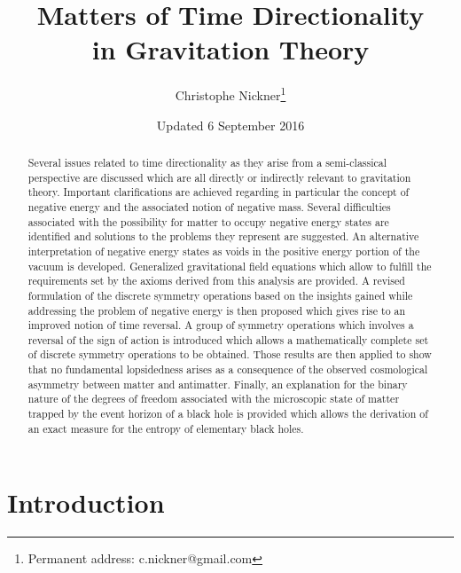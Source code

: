 \documentclass[notitlepage,12pt]{report}
\title{\bf Matters of Time Directionality\\ in Gravitation Theory}
\author{Christophe Nickner\footnote{Permanent address: {\ttfamily c.nickner@gmail.com}}}
\date{\normalsize{Updated 6 September 2016}}
\begin{document}
\maketitle

\begin{abstract}
Several issues related to time directionality as they arise from a semi-classical perspective are discussed which are all directly or indirectly relevant to gravitation theory. Important clarifications are achieved regarding in particular the concept of negative energy and the associated notion of negative mass. Several difficulties associated with the possibility for matter to occupy negative energy states are identified and solutions to the problems they represent are suggested. An alternative interpretation of negative energy states as voids in the positive energy portion of the vacuum is developed. Generalized gravitational field equations which allow to fulfill the requirements set by the axioms derived from this analysis are provided. A revised formulation of the discrete symmetry operations based on the insights gained while addressing the problem of negative energy is then proposed which gives rise to an improved notion of time reversal. A group of symmetry operations which involves a reversal of the sign of action is introduced which allows a mathematically complete set of discrete symmetry operations to be obtained. Those results are then applied to show that no fundamental lopsidedness arises as a consequence of the observed cosmological asymmetry between matter and antimatter. Finally, an explanation for the binary nature of the degrees of freedom associated with the microscopic state of matter trapped by the event horizon of a black hole is provided which allows the derivation of an exact measure for the entropy of elementary black holes.
\end{abstract}

\tableofcontents

\listoffigures
\listoftables

\raggedbottom


\chapter{Introduction\label{chap:01}}
\end{document}
